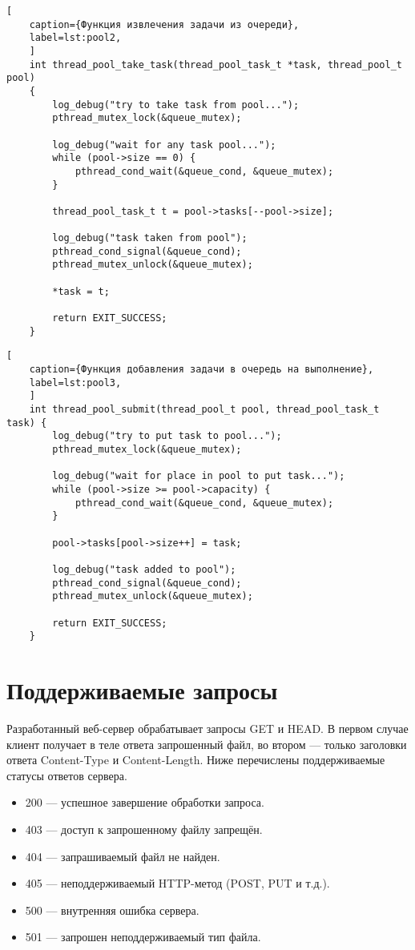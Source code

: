\begin{lstlisting}[
	caption={Функция извлечения задачи из очереди},
	label=lst:pool2,
	]
	int thread_pool_take_task(thread_pool_task_t *task, thread_pool_t pool) 
	{
		log_debug("try to take task from pool...");
		pthread_mutex_lock(&queue_mutex);
		
		log_debug("wait for any task pool...");
		while (pool->size == 0) {
			pthread_cond_wait(&queue_cond, &queue_mutex);
		}
		
		thread_pool_task_t t = pool->tasks[--pool->size];
		
		log_debug("task taken from pool");
		pthread_cond_signal(&queue_cond);
		pthread_mutex_unlock(&queue_mutex);
		
		*task = t;
		
		return EXIT_SUCCESS;
	}
\end{lstlisting}

\begin{lstlisting}[
	caption={Функция добавления задачи в очередь на выполнение},
	label=lst:pool3,
	]
	int thread_pool_submit(thread_pool_t pool, thread_pool_task_t task) {
		log_debug("try to put task to pool...");
		pthread_mutex_lock(&queue_mutex);
		
		log_debug("wait for place in pool to put task...");
		while (pool->size >= pool->capacity) {
			pthread_cond_wait(&queue_cond, &queue_mutex);
		}
		
		pool->tasks[pool->size++] = task;
		
		log_debug("task added to pool");
		pthread_cond_signal(&queue_cond);
		pthread_mutex_unlock(&queue_mutex);
		
		return EXIT_SUCCESS;
	}
\end{lstlisting}



\section{Поддерживаемые запросы}

Разработанный веб-сервер обрабатывает запросы GET и HEAD. В первом случае клиент получает в теле ответа запрошенный файл, во втором --- только заголовки ответа Content-Type и Content-Length. Ниже перечислены поддерживаемые статусы ответов сервера.

\begin{itemize}[label*=---]
	\item 200 --- успешное завершение обработки запроса.
	\item 403 --- доступ к запрошенному файлу запрещён.
	\item 404 --- запрашиваемый файл не найден.
	\item 405 --- неподдерживаемый HTTP-метод (POST, PUT и т.д.).
	\item 500 --- внутренняя ошибка сервера.
	\item 501 --- запрошен неподдерживаемый тип файла.
\end{itemize}

